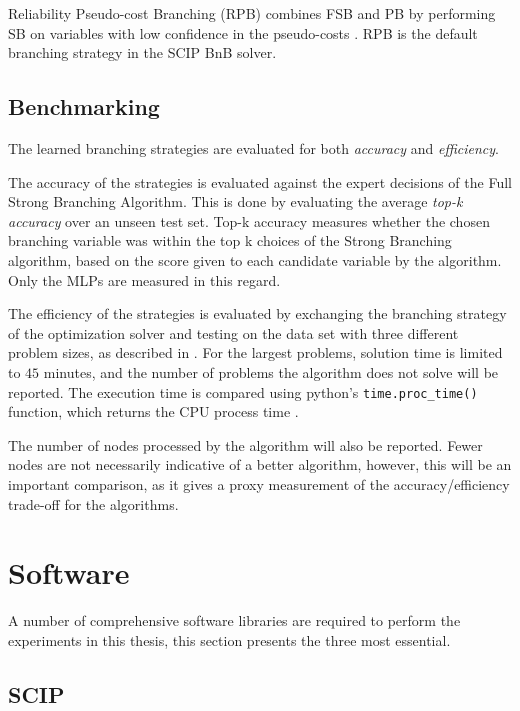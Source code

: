 Reliability Pseudo-cost Branching (\gls{RPB}) \cite{achterberg2004branching} combines \gls{FSB} and \gls{PB} by performing SB on variables with low confidence in the pseudo-costs \cite{gamrath2018measuring}. \gls{RPB} is the default branching strategy in the \gls{SCIP} \gls{BnB} solver. 


\subsection{Benchmarking}

The learned branching strategies are evaluated for both \textit{accuracy} and \textit{efficiency}. 

The accuracy of the strategies is evaluated against the expert decisions of the Full Strong Branching Algorithm. This is done by evaluating the average \textit{top-k accuracy} over an unseen test set. Top-k accuracy measures whether the chosen branching variable was within the top k choices of the Strong Branching algorithm, based on the score given to each candidate variable by the algorithm. Only the \gls{MLP}s are measured in this regard. 

The efficiency of the strategies is evaluated by exchanging the branching strategy of the optimization solver and testing on the data set with three different problem sizes, as described in . For the largest problems, solution time is limited to $ 45 $ minutes, and the number of problems the algorithm does not solve will be reported.
The execution time is compared using python's \verb|time.proc_time()| function, which returns the \gls{CPU} process time \cite{rossum2009python}. 

The number of nodes processed by the algorithm will also be reported. Fewer nodes are not necessarily indicative of a better algorithm, however, this will be an important comparison, as it gives a proxy measurement of the accuracy/efficiency trade-off for the algorithms. 





\section{Software}

A number of comprehensive software libraries are required to perform the experiments in this thesis, this section presents the three most essential.  


\subsection{SCIP}

